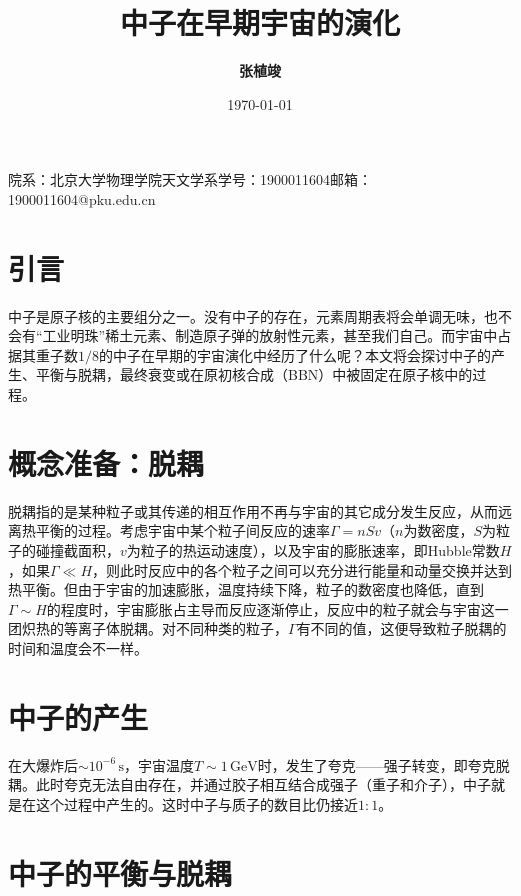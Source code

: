 \documentclass[a4paper,fontset=none]{ctexart}
\begin{document}
\title{\textbf{中子在早期宇宙的演化}}
\author{\Large\textbf{张植竣}}
\date{\today}
\maketitle
\begin{center}
    院系：北京大学物理学院天文学系\hspace{2em}学号：1900011604\hspace{2em}邮箱：1900011604@pku.edu.cn
\end{center}

\section*{引言}

中子是原子核的主要组分之一。没有中子的存在，元素周期表将会单调无味，也不会有“工业明珠”稀土元素、制造原子弹的放射性元素，甚至我们自己。而宇宙中占据其重子数$1/8$的中子在早期的宇宙演化中经历了什么呢？本文将会探讨中子的产生、平衡与脱耦，最终衰变或在原初核合成（BBN）中被固定在原子核中的过程。

\section*{概念准备：脱耦}

脱耦指的是某种粒子或其传递的相互作用不再与宇宙的其它成分发生反应，从而远离热平衡的过程。考虑宇宙中某个粒子间反应的速率$\Gamma=nSv$（$n$为数密度，$S$为粒子的碰撞截面积，$v$为粒子的热运动速度），以及宇宙的膨胀速率，即Hubble常数$H$，如果$\Gamma\ll H$，则此时反应中的各个粒子之间可以充分进行能量和动量交换并达到热平衡。但由于宇宙的加速膨胀，温度持续下降，粒子的数密度也降低，直到$\Gamma\sim H$的程度时，宇宙膨胀占主导而反应逐渐停止，反应中的粒子就会与宇宙这一团炽热的等离子体脱耦。对不同种类的粒子，$\Gamma$有不同的值，这便导致粒子脱耦的时间和温度会不一样。

\section*{中子的产生}

在大爆炸后$\sim10^{-6}\,\mathrm{s}$，宇宙温度$T\sim1\,\mathrm{GeV}$时，发生了夸克——强子转变，即夸克脱耦。此时夸克无法自由存在，并通过胶子相互结合成强子（重子和介子），中子就是在这个过程中产生的。这时中子与质子的数目比仍接近$1:1$。

\section*{中子的平衡与脱耦}
\end{document}
